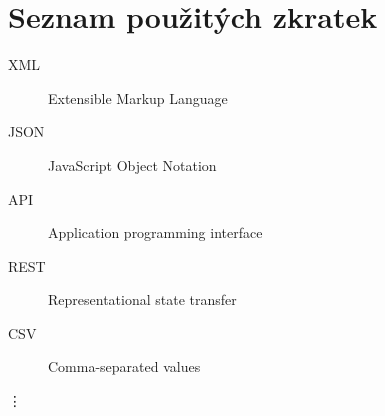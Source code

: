 \documentclass[11pt,twoside,a4paper]{book}
\begin{document}
%




%
{
\def\CS{$\cal C\kern-0.1667em\lower.5ex\hbox{$\cal S$}\kern-0.075em $}

}

%

\appendix




\chapter{Seznam použitých zkratek}

\begin{description}
\item[XML] Extensible Markup Language
\item[JSON] JavaScript Object Notation
\item[API] Application programming interface
\item[REST] Representational state transfer
\item[CSV] Comma-separated values
\end{description}
\vdots
\end{document}
